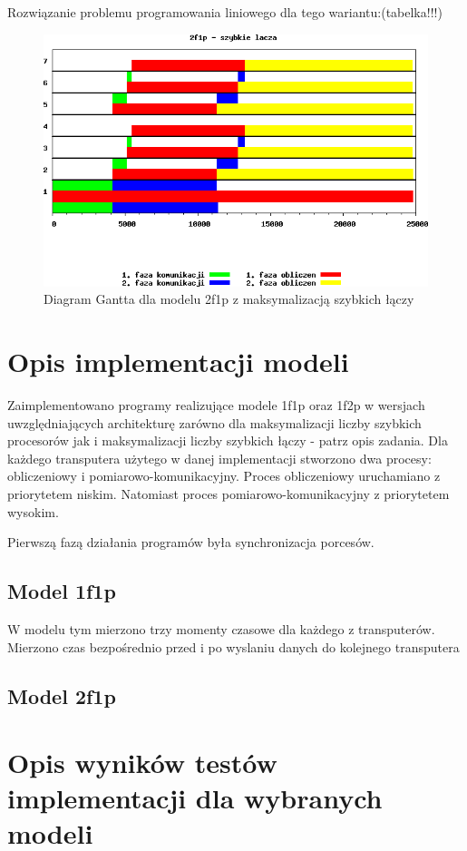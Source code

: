 \documentclass[a4paper,11pt, titlepage]{article}
\begin{document}
Rozwiązanie problemu programowania liniowego dla tego wariantu:(tabelka!!!)
\begin{figure}[htp!]
\includegraphics[width=1.0\textwidth]{wykresy/1p2f_lacza}
\caption{Diagram Gantta dla modelu 2f1p z maksymalizacją szybkich łączy \label{1p2f_l}}
\end{figure}

\section{Opis implementacji modeli}
Zaimplementowano programy realizujące modele 1f1p oraz 1f2p w wersjach uwzględniających architekturę zarówno dla maksymalizacji liczby szybkich procesorów jak i maksymalizacji liczby szybkich łączy - patrz opis zadania. Dla każdego transputera użytego w danej implementacji stworzono dwa procesy: obliczeniowy i pomiarowo-komunikacyjny. Proces obliczeniowy uruchamiano z priorytetem niskim. Natomiast proces pomiarowo-komunikacyjny z priorytetem wysokim.

Pierwszą fazą działania programów była synchronizacja porcesów.

\subsection{Model 1f1p}
W modelu tym mierzono trzy momenty czasowe dla każdego z transputerów. Mierzono czas bezpośrednio przed i po wyslaniu danych do kolejnego transputera
\subsection{Model 2f1p}
\section{Opis wyników testów implementacji dla wybranych modeli}
\end{document}

